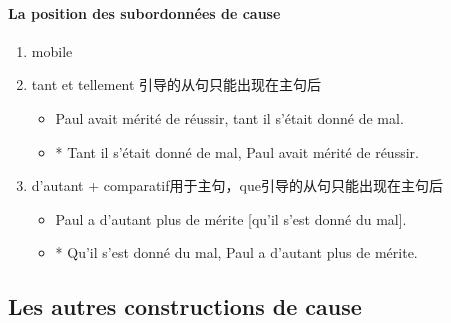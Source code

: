 \documentclass[UTF8]{report}
\begin{document}
\paragraph{La position des subordonnées de cause}
\begin{enumerate}
    \item mobile
    \item tant et tellement 引导的从句只能出现在主句后
    \begin{itemize}
        \item Paul avait mérité de réussir, tant il s’était donné de mal.
        \item * Tant il s’était donné de mal, Paul avait mérité de réussir.
    \end{itemize}
    \item d’autant + comparatif用于主句，que引导的从句只能出现在主句后
    \begin{itemize}
        \item Paul a d’autant plus de mérite [qu’il s’est donné du mal].
        \item * Qu’il s’est donné du mal, Paul a d’autant plus de mérite.
    \end{itemize}
\end{enumerate}

\subsection{Les autres constructions de cause}
\end{document}
